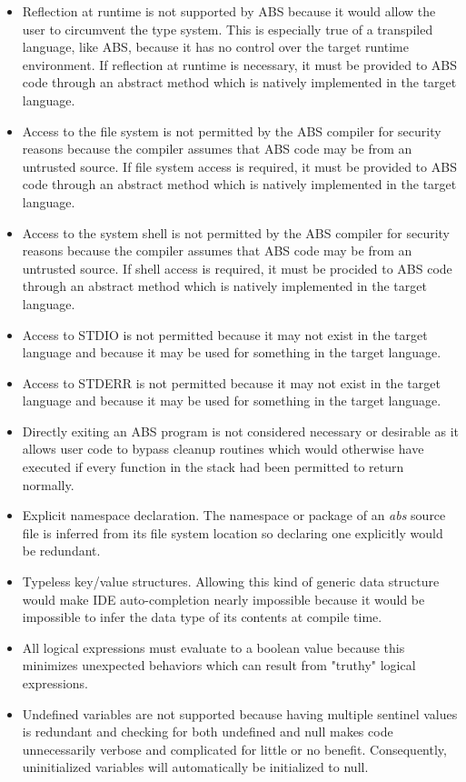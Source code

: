 \documentclass[hidelinks]{article}
\begin{document}
\begin{itemize}
\item Reflection at runtime is not supported by ABS because it would allow the user to circumvent the type system. This is especially true of a transpiled language, like ABS, because it has no control over the target runtime environment. If reflection at runtime is necessary, it must be provided to ABS code through an abstract method which is natively implemented in the target language.
\item Access to the file system is not permitted by the ABS compiler for security reasons because the compiler assumes that ABS code may be from an untrusted source. If file system access is required, it must be provided to ABS code through an abstract method which is natively implemented in the target language.
\item Access to the system shell is not permitted by the ABS compiler for security reasons because the compiler assumes that ABS code may be from an untrusted source. If shell access is required, it must be procided to ABS code through an abstract method which is natively implemented in the target language.
\item Access to STDIO is not permitted because it may not exist in the target language and because it may be used for something in the target language.
\item Access to STDERR is not permitted because it may not exist in the target language and because it may be used for something in the target language.
\item Directly exiting an ABS program is not considered necessary or desirable as it allows user code to bypass cleanup routines which would otherwise have executed if every function in the stack had been permitted to return normally.
\item Explicit namespace declaration. The namespace or package of an \textit{abs} source file is inferred from its file system location so declaring one explicitly would be redundant. 
\item Typeless key/value structures. Allowing this kind of generic data structure would make IDE auto-completion nearly impossible because it would be impossible to infer the data type of its contents at compile time.
\item All logical expressions must evaluate to a boolean value because this minimizes unexpected behaviors which can result from "truthy" logical expressions.
\item Undefined variables are not supported because having multiple sentinel values is redundant and checking for both undefined and null makes code unnecessarily verbose and complicated for little or no benefit. Consequently, uninitialized variables will automatically be initialized to null.
\end{itemize}
\end{document}
